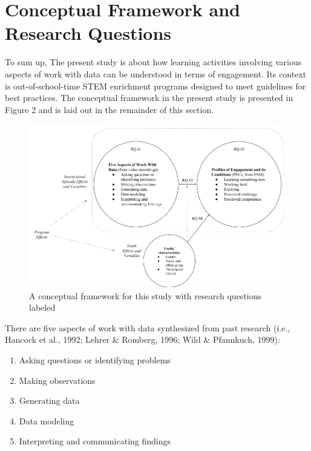 \documentclass[]{book}
\providecommand{\tightlist}{%
  \setlength{\itemsep}{0pt}\setlength{\parskip}{0pt}}
\theoremstyle{definition}
\theoremstyle{definition}
\theoremstyle{definition}
\theoremstyle{remark}
\begin{document}
\section{Conceptual Framework and Research
Questions}\label{conceptual-framework-and-research-questions}

To sum up, The present study is about how learning activities involving
various aspects of work with data can be understood in terms of
engagement. Its context is out-of-school-time STEM enrichment programs
designed to meet guidelines for best practices. The conceptual framework
in the present study is presented in Figure 2 and is laid out in the
remainder of this section.

\begin{figure}

{\centering \includegraphics[width=0.8\linewidth]{images/figure2} 

}

\caption{A conceptual framework for this study with research questions labeled}\label{fig:unnamed-chunk-2}
\end{figure}

There are five aspects of work with data synthesized from past research
(i.e., Hancock et al., 1992; Lehrer \& Romberg, 1996; Wild \& Pfannkuch,
1999):

\begin{enumerate}
\def\labelenumi{\arabic{enumi}.}
\tightlist
\item
  Asking questions or identifying problems
\item
  Making observations
\item
  Generating data
\item
  Data modeling
\item
  Interpreting and communicating findings
\end{enumerate}
\end{document}
